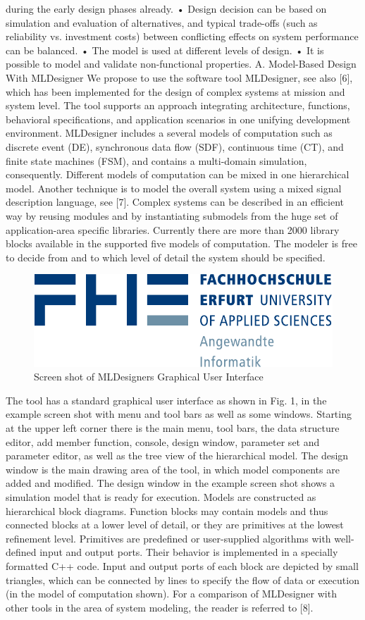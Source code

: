 during the early design phases already.
• Design decision can be based on simulation and evaluation of alternatives, and typical trade-offs (such as reliability vs. investment costs) between conflicting effects on
system performance can be balanced.
• The model is used at different levels of design.
• It is possible to model and validate non-functional properties.
A. Model-Based Design With MLDesigner
We propose to use the software tool MLDesigner, see also
[6], which has been implemented for the design of complex
systems at mission and system level. The tool supports an
approach integrating architecture, functions, behavioral specifications, and application scenarios in one unifying development
environment.
MLDesigner includes a several models of computation
such as discrete event (DE), synchronous data flow (SDF),
continuous time (CT), and finite state machines (FSM), and
contains a multi-domain simulation, consequently. Different
models of computation can be mixed in one hierarchical model.
Another technique is to model the overall system using a mixed
signal description language, see [7]. Complex systems can
be described in an efficient way by reusing modules and by
instantiating submodels from the huge set of application-area
specific libraries. Currently there are more than 2000 library
blocks available in the supported five models of computation.
The modeler is free to decide from and to which level of detail
the system should be specified.
\begin{figure}%
    \centering
    \includegraphics[width=.8\linewidth]{images/Logo_Informatik}
    \caption{Screen shot of MLDesigners Graphical User Interface}
    \label{fig:REPLACE}
\end{figure}

The tool has a standard graphical user interface as shown
in Fig. 1, in the example screen shot with menu and tool bars
as well as some windows. Starting at the upper left corner
there is the main menu, tool bars, the data structure editor, add
member function, console, design window, parameter set and
parameter editor, as well as the tree view of the hierarchical
model. The design window is the main drawing area of the
tool, in which model components are added and modified. The
design window in the example screen shot shows a simulation
model that is ready for execution. Models are constructed
as hierarchical block diagrams. Function blocks may contain
models and thus connected blocks at a lower level of detail, or
they are primitives at the lowest refinement level. Primitives
are predefined or user-supplied algorithms with well-defined
input and output ports. Their behavior is implemented in a
specially formatted C++ code. Input and output ports of each
block are depicted by small triangles, which can be connected
by lines to specify the flow of data or execution (in the model
of computation shown).
For a comparison of MLDesigner with other tools in the
area of system modeling, the reader is referred to [8].